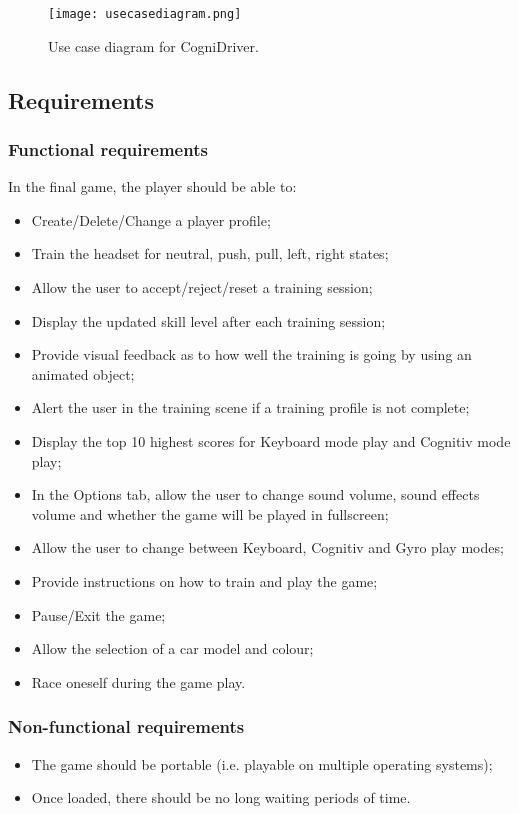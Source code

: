 \begin{figure}
  \centering
  \texttt{[image: usecasediagram.png]}
  \caption{Use case diagram for CogniDriver.}
    \label{fig:useCaseDiagram}           
\end{figure}

\subsection{Requirements}

\subsubsection{Functional requirements}
In the final game, the player should be able to: 
\begin{itemize}
	\item Create/Delete/Change a player profile;
	\item Train the headset for neutral, push, pull, left, right states;
	\item Allow the user to accept/reject/reset a training session;
	\item Display the updated skill level after each training session;
	\item Provide visual feedback as to how well the training is going by using an animated object;
	\item Alert the user in the training scene if a training profile is not complete;
	\item Display the top 10 highest scores for Keyboard mode play and Cognitiv mode play;
	\item In the Options tab, allow the user to change sound volume, sound effects volume and whether the game will be played in fullscreen;
	\item Allow the user to change between Keyboard, Cognitiv and Gyro play modes;
	\item Provide instructions on how to train and play the game;
	\item Pause/Exit the game;
	\item Allow the selection of a car model and colour;
	\item Race oneself during the game play.
\end{itemize}

\subsubsection{Non-functional requirements}
\begin{itemize}
	\item The game should be portable (i.e. playable on multiple operating systems);
	\item Once loaded, there should be no long waiting periods of time.
\end{itemize}

